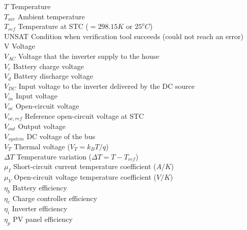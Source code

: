 $T$ Temperature \\
$ T_{air} $ Ambient temperature \\
$ T_{ref}$ Temperature at STC ($=298.15 K$ or $25^{o}C$) \\
UNSAT Condition when verification tool succeeds (could not reach an error) \\
V Voltage \\
$ V_{AC}  $ Voltage that the inverter supply to the house \\
$V_{c}$ Battery charge voltage  \\
$V_{d}$ Battery discharge voltage \\
$ V_{DC} $ Input voltage to the inverter delivered by the DC source \\
$ V_{in} $ Input voltage \\
$ V_{oc} $ Open-circuit voltage \\
$ V_{oc,ref} $ Reference open-circuit voltage at STC \\
$ V_{out} $ Output voltage \\
$ V_{system} $ DC voltage of the bus \\
$V_{T}$ Thermal voltage ($ V_{T}=k_{B}T/q $) \\
$\Delta T$ Temperature variation ($\Delta T=T-T_{ref} $) \\
$ \mu_{I} $ Short-circuit current temperature coefficient ($A/K$) \\
$ \mu_{V} $ Open-circuit voltage temperature coefficient ($ V/K $) \\
$\eta_{b}$ Battery efficiency \\
$\eta_{c}$ Charge controller efficiency \\
$\eta_{i}$ Inverter efficiency \\
$\eta_{p}$ PV panel efficiency \\